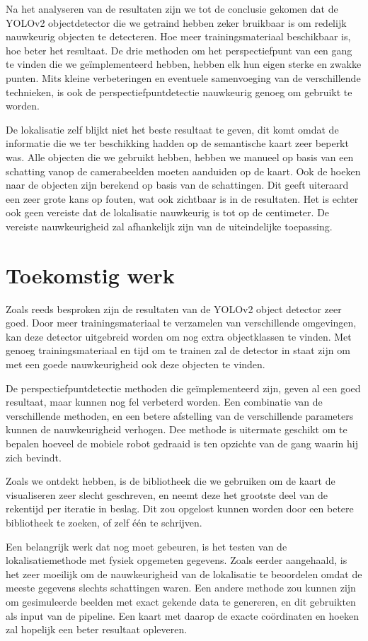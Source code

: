 Na het analyseren van de resultaten zijn we tot de conclusie gekomen dat de YOLOv2 objectdetector die we getraind hebben zeker bruikbaar is
om redelijk nauwkeurig objecten te detecteren. Hoe meer trainingsmateriaal beschikbaar is, hoe beter het resultaat.
De drie methoden om het perspectiefpunt van een gang te vinden die we ge\"{i}mplementeerd hebben, hebben elk hun eigen sterke en zwakke punten.
Mits kleine verbeteringen en eventuele samenvoeging van de verschillende technieken,
is ook de perspectiefpuntdetectie nauwkeurig genoeg om gebruikt te worden.

De lokalisatie zelf blijkt niet het beste resultaat te geven, dit komt omdat de informatie die we ter beschikking hadden op de semantische kaart zeer beperkt was.
Alle objecten die we gebruikt hebben, hebben we manueel op basis van een schatting vanop de camerabeelden moeten aanduiden op de kaart.
Ook de hoeken naar de objecten zijn berekend op basis van de schattingen.
Dit geeft uiteraard een zeer grote kans op fouten, wat ook zichtbaar is in de resultaten.
Het is echter ook geen vereiste dat de lokalisatie nauwkeurig is tot op de centimeter.
De vereiste nauwkeurigheid zal afhankelijk zijn van de uiteindelijke toepassing.


\section{Toekomstig werk}
Zoals reeds besproken zijn de resultaten van de YOLOv2 object detector zeer goed.
Door meer trainingsmateriaal te verzamelen van verschillende omgevingen, kan deze detector uitgebreid worden om nog extra objectklassen te vinden.
Met genoeg trainingsmateriaal en tijd om te trainen zal de detector in staat zijn om met een goede nauwkeurigheid ook deze objecten te vinden.

De perspectiefpuntdetectie methoden die ge\"{i}mplementeerd zijn, geven al een goed resultaat, maar kunnen nog fel verbeterd worden.
Een combinatie van de verschillende methoden, en een betere afstelling van de verschillende parameters kunnen de nauwkeurigheid verhogen.
Dee methode is uitermate geschikt om te bepalen hoeveel de mobiele robot gedraaid is ten opzichte van de gang waarin hij zich bevindt.

Zoals we ontdekt hebben, is de bibliotheek die we gebruiken om de kaart de visualiseren zeer slecht geschreven, en neemt deze het grootste deel van
de rekentijd per iteratie in beslag.
Dit zou opgelost kunnen worden door een betere bibliotheek te zoeken, of zelf \'{e}\'{e}n te schrijven.

Een belangrijk werk dat nog moet gebeuren, is het testen van de lokalisatiemethode met fysiek opgemeten gegevens.
Zoals eerder aangehaald, is het zeer moeilijk om de nauwkeurigheid van de lokalisatie te beoordelen omdat de meeste gegevens slechts schattingen waren.
Een andere methode zou kunnen zijn om gesimuleerde beelden met exact gekende data te genereren, en dit gebruikten als input van de pipeline.
Een kaart met daarop de exacte co\"{o}rdinaten en hoeken zal hopelijk een beter resultaat opleveren.